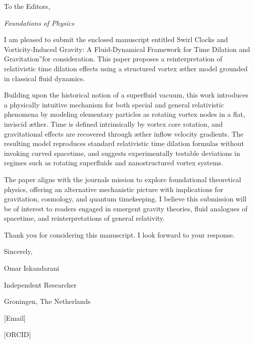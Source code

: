 
To the Editors,

\textit{Foundations of Physics}


I am pleased to submit the enclosed manuscript entitled \grqq Swirl Clocks and Vorticity-Induced Gravity: A Fluid-Dynamical Framework for Time Dilation and Gravitation\textquotedblright for consideration. This paper proposes a reinterpretation of relativistic time dilation effects using a structured vortex æther model grounded in classical fluid dynamics.


Building upon the historical notion of a superfluid vacuum, this work introduces a physically intuitive mechanism for both special and general relativistic phenomena by modeling elementary particles as rotating vortex nodes in a flat, inviscid æther. Time is defined intrinsically by vortex core rotation, and gravitational effects are recovered through æther inflow velocity gradients. The resulting model reproduces standard relativistic time dilation formulas without invoking curved spacetime, and suggests experimentally testable deviations in regimes such as rotating superfluids and nanostructured vortex systems.


The paper aligns with the journal\rqs s mission to explore foundational theoretical physics, offering an alternative mechanistic picture with implications for gravitation, cosmology, and quantum timekeeping. I believe this submission will be of interest to readers engaged in emergent gravity theories, fluid analogues of spacetime, and reinterpretations of general relativity.


Thank you for considering this manuscript. I look forward to your response.


Sincerely,

Omar Iskandarani

Independent Researcher

Groningen, The Netherlands

[Email]

[ORCID]